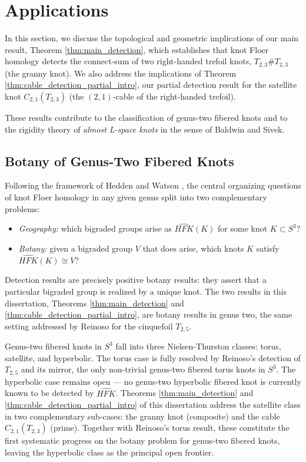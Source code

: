 \section{Applications}
\label{sec:applications}

In this section, we discuss the topological and geometric implications of our main result, Theorem \ref{thm:main_detection}, which establishes that knot Floer homology detects the connect-sum of two right-handed trefoil knots, $T_{2,3} \# T_{2,3}$ (the granny knot). We also address the implications of Theorem \ref{thm:cable_detection_partial_intro}, our partial detection result for the satellite knot $C_{2,1}(T_{2,3})$ (the $(2,1)$-cable of the right-handed trefoil).

These results contribute to the classification of genus-two fibered knots and to the rigidity theory of \textit{almost L-space knots} in the sense of Baldwin and Sivek.

\subsection{Botany of Genus-Two Fibered Knots}

Following the framework of Hedden and Watson \cite{HeddenWatson2018}, the central organizing questions of knot Floer homology in any given genus split into two complementary problems:
\begin{itemize}
    \item \emph{Geography:} which bigraded groups arise as $\widehat{HFK}(K)$ for some knot $K \subset S^3$?
    \item \emph{Botany:} given a bigraded group $V$ that does arise, which knots $K$ satisfy $\widehat{HFK}(K) \cong V$?
\end{itemize}
Detection results are precisely positive botany results: they assert that a particular bigraded group is realized by a unique knot. The two results in this dissertation, Theorems \ref{thm:main_detection} and \ref{thm:cable_detection_partial_intro}, are botany results in genus two, the same setting addressed by Reinoso \cite{Reinoso2023} for the cinquefoil $T_{2,5}$.

Genus-two fibered knots in $S^3$ fall into three Nielsen-Thurston classes: torus, satellite, and hyperbolic. The torus case is fully resolved by Reinoso's detection of $T_{2,5}$ and its mirror, the only non-trivial genus-two fibered torus knots in $S^3$. The hyperbolic case remains open --- no genus-two hyperbolic fibered knot is currently known to be detected by $\widehat{HFK}$. Theorems \ref{thm:main_detection} and \ref{thm:cable_detection_partial_intro} of this dissertation address the satellite class in two complementary sub-cases: the granny knot (composite) and the cable $C_{2,1}(T_{2,3})$ (prime). Together with Reinoso's torus result, these constitute the first systematic progress on the botany problem for genus-two fibered knots, leaving the hyperbolic class as the principal open frontier.

